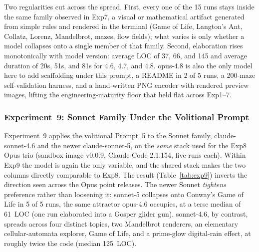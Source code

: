 \documentclass{article}
\begin{document}
Two regularities cut across the spread. First, every one of the
15 runs stays inside the same family observed in Exp7, a
visual or mathematical artifact generated from simple rules and
rendered in the terminal (Game of Life, Langton's Ant, Collatz,
Lorenz, Mandelbrot, mazes, flow fields); what varies is only
whether a model collapses onto a single member of that family.
Second, elaboration rises monotonically with model version:
average LOC of 37, 66, and 145 and average duration of 20s, 51s,
and 81s for 4.6, 4.7, and 4.8. opus-4.8 is also the only model
here to add scaffolding under this prompt, a README in 2 of 5
runs, a 200-maze self-validation harness, and a hand-written PNG
encoder with rendered preview images, lifting the
engineering-maturity floor that held flat across Exp1--7.

\begin{table}[t]
\caption{Experiment~8: Prompt~5 (``Just do something you
  want.'') across the Opus spectrum on harness 2.1.154. Identical
  stack; model is the only variable.}
\label{tab:exp8}
\small{}
\end{table}

\subsubsection{Experiment~9: Sonnet Family Under the Volitional Prompt}

Experiment~9 applies the volitional Prompt~5 to the Sonnet
family, claude-sonnet-4.6 and the newer claude-sonnet-5, on the
\emph{same} stack used for the Exp8 Opus trio (sandbox image
v0.0.9, Claude Code 2.1.154, five runs each). Within Exp9 the
model is again the only variable, and the shared stack makes the
two columns directly comparable to Exp8. The result
(Table~\ref{tab:exp9}) inverts the direction seen across the
Opus point releases. The newer Sonnet \emph{tightens} preference
rather than loosening it: sonnet-5 collapses onto Conway's Game
of Life in 5 of 5 runs, the same attractor opus-4.6 occupies, at
a terse median of 61~LOC (one run elaborated into a Gosper glider
gun). sonnet-4.6, by contrast, spreads across four distinct
topics, two Mandelbrot renderers, an elementary cellular-automata
explorer, Game of Life, and a prime-glow digital-rain effect, at
roughly twice the code (median 125~LOC).
\end{document}
